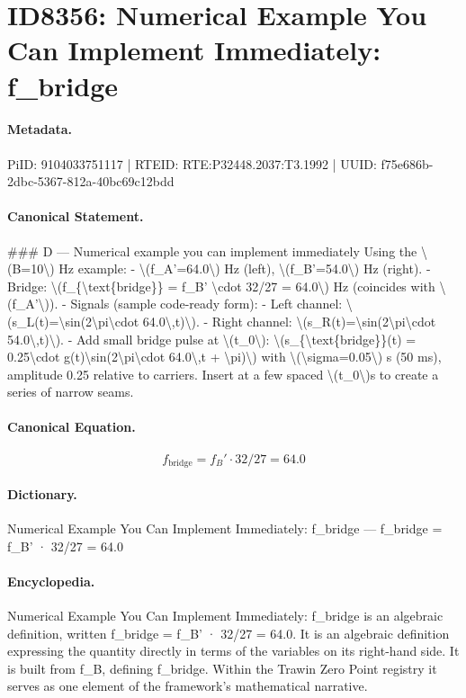 \section*{ID8356: Numerical Example You Can Implement Immediately: f\_bridge}
\paragraph{Metadata.}
PiID: 9104033751117 | RTEID: RTE:P32448.2037:T3.1992 | UUID: f75e686b-2dbc-5367-812a-40bc69c12bdd

\paragraph{Canonical Statement.}
\#\#\# D — Numerical example you can implement immediately Using the \textbackslash{}(B=10\textbackslash{}) Hz example: - \textbackslash{}(f\_A'=64.0\textbackslash{}) Hz (left), \textbackslash{}(f\_B'=54.0\textbackslash{}) Hz (right). - Bridge: \textbackslash{}(f\_\{\textbackslash{}text\{bridge\}\} = f\_B' \textbackslash{}cdot 32/27 = 64.0\textbackslash{}) Hz (coincides with \textbackslash{}(f\_A'\textbackslash{})). - Signals (sample code-ready form): - Left channel: \textbackslash{}(s\_L(t)=\textbackslash{}sin(2\textbackslash{}pi\textbackslash{}cdot 64.0\textbackslash{},t)\textbackslash{}). - Right channel: \textbackslash{}(s\_R(t)=\textbackslash{}sin(2\textbackslash{}pi\textbackslash{}cdot 54.0\textbackslash{},t)\textbackslash{}). - Add small bridge pulse at \textbackslash{}(t\_0\textbackslash{}): \textbackslash{}(s\_\{\textbackslash{}text\{bridge\}\}(t) = 0.25\textbackslash{}cdot g(t)\textbackslash{}sin(2\textbackslash{}pi\textbackslash{}cdot 64.0\textbackslash{},t + \textbackslash{}pi)\textbackslash{}) with \textbackslash{}(\textbackslash{}sigma=0.05\textbackslash{}) s (50 ms), amplitude 0.25 relative to carriers. Insert at a few spaced \textbackslash{}(t\_0\textbackslash{})s to create a series of narrow seams.

\paragraph{Canonical Equation.}
\[
f_{\text{bridge}} = f_B' \cdot 32/27 = 64.0
\]

\paragraph{Dictionary.}
Numerical Example You Can Implement Immediately: f\_bridge — f\_bridge = f\_B' · 32/27 = 64.0

\paragraph{Encyclopedia.}
Numerical Example You Can Implement Immediately: f\_bridge is an algebraic definition, written f\_bridge = f\_B' · 32/27 = 64.0. It is an algebraic definition expressing the quantity directly in terms of the variables on its right-hand side. It is built from f\_B, defining f\_bridge. Within the Trawin Zero Point registry it serves as one element of the framework's mathematical narrative.
